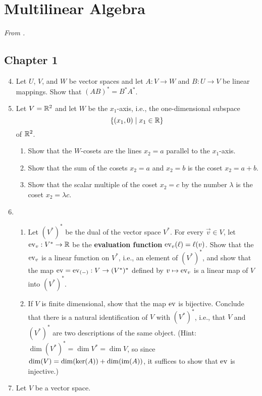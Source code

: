 \documentclass[../psets.tex]{subfiles}
\begin{document}
\section{Multilinear Algebra}
\emph{From \textcite{bib:DifferentialForms}.}
\subsection*{Chapter 1}
\begin{enumerate}[label={\textbf{1.2.\roman*.}}]
    \setcounter{enumi}{3}
    \item Let $U$, $V$, and $W$ be vector spaces and let $A:V\to W$ and $B:U\to V$ be linear mappings. Show that $(AB)^*=B^*A^*$.
    \item Let $V=\mathbb{R}^2$ and let $W$ be the $x_1$-axis, i.e., the one-dimensional subspace
    \begin{equation*}
        \{(x_1,0)\mid x_1\in\mathbb{R}\}
    \end{equation*}
    of $\mathbb{R}^2$.
    \begin{enumerate}
        \item Show that the $W$-cosets are the lines $x_2=a$ parallel to the $x_1$-axis.
        \item Show that the sum of the cosets $x_2=a$ and $x_2=b$ is the coset $x_2=a+b$.
        \item Show that the scalar multiple of the coset $x_2=c$ by the number $\lambda$ is the coset $x_2=\lambda c$.
    \end{enumerate}
    \item 
    \begin{enumerate}
        \item Let $(V^*)^*$ be the dual of the vector space $V^*$. For every $\vec{v}\in V$, let $\operatorname{ev}_v:V^*\to\mathbb{R}$ be the \textbf{evaluation function} $\operatorname{ev}_v(\ell)=\ell(v)$. Show that the $\operatorname{ev}_v$ is a linear function on $V^*$, i.e., an element of $(V^*)^*$, and show that the map $\operatorname{ev}=\operatorname{ev}_{(-)}:V\to(V^*)^*$ defined by $v\mapsto\operatorname{ev}_v$ is a linear map of $V$ into $(V^*)^*$.
        \item If $V$ is finite dimensional, show that the map $\operatorname{ev}$ is bijective. Conclude that there is a natural identification of $V$ with $(V^*)^*$, i.e., that $V$ and $(V^*)^*$ are two descriptions of the same object. (Hint: $\dim(V^*)^*=\dim V^*=\dim V$, so since $\dim(V)=\dim(\ker(A))+\dim(\operatorname{im}(A))$, it suffices to show that $\operatorname{ev}$ is injective.)
    \end{enumerate}
    \setcounter{enumi}{10}
    \item Let $V$ be a vector space.

\end{enumerate}
\end{document}
